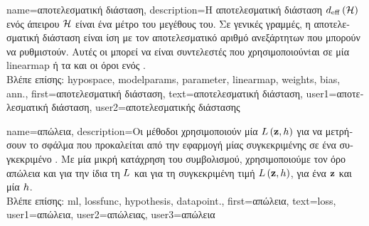 {name={\foreignlanguage{greek}{αποτελεσματική διάσταση}},
	description={\foreignlanguage{greek}{Η αποτελεσματική διάσταση} 
		$d_{\rm eff} \left( \mathcal{H} \right)$ \foreignlanguage{greek}{ενός ά\-πειρου}  $\mathcal{H}$ \foreignlanguage{greek}{είναι ένα μέτρο του μεγέθους του. 
		Σε γενικές γραμμές, η αποτελεσματική διάσταση είναι ίση με τον αποτελεσματικό αριθμό ανεξάρτητων} 
		 \foreignlanguage{greek}{που μπορούν να ρυθμιστούν. Αυτές οι}
		 \foreignlanguage{greek}{μπορεί να είναι συντελεστές που χρησιμοποιούνtαι σε μία} \gls{linearmap} 
		\foreignlanguage{greek}{ή τα}  \foreignlanguage{greek}{και οι όροι}  \foreignlanguage{greek}{ενός} .\\
		\foreignlanguage{greek}{Βλέπε επίσης:} \gls{hypospace}, \glspl{modelparam}, \gls{parameter}, \gls{linearmap}, \gls{weights}, \gls{bias}, \gls{ann}.},
	first={\foreignlanguage{greek}{αποτελεσματική διάσταση}},
	text={\foreignlanguage{greek}{αποτελεσματική διάσταση}},
	user1={\foreignlanguage{greek}{αποτελεσματική διάσταση}}, %
	user2={\foreignlanguage{greek}{αποτελεσματικής διάστασης}} %
}

{name={\foreignlanguage{greek}{απώλεια}}, 
	description={\foreignlanguage{greek}{Οι μέθοδοι}  
		\foreignlanguage{greek}{χρησιμοποιούν μία}  $L\left({\bf z},h \right)$ \foreignlanguage{greek}{για 
		να μετρήσουν το σφάλμα που προκαλείται από την εφαρμογή μίας  
		συγκεκριμένης}  \foreignlanguage{greek}{σε ένα συγκεκριμένο} . \foreignlanguage{greek}{Με 
		μία μικρή κατάχρηση του συμβολισμού, χρησιμοποιούμε τον όρο απώλεια και για την ίδια τη}  $L$ 
		\foreignlanguage{greek}{και για τη συγκεκριμένη τιμή} $L\left({\bf z},h \right)$, \foreignlanguage{greek}{για ένα} 
		 ${\bf z}$ \foreignlanguage{greek}{και μία}  $h$.\\
		\foreignlanguage{greek}{Βλέπε επίσης:} \gls{ml}, \gls{lossfunc}, \gls{hypothesis}, \gls{datapoint}.},
	first={\foreignlanguage{greek}{απώλεια}},
	text={loss},
	user1={\foreignlanguage{greek}{απώλεια}}, %
	user2={\foreignlanguage{greek}{απώλειας}}, %
	user3={\foreignlanguage{greek}{απώλεια}} %
}

